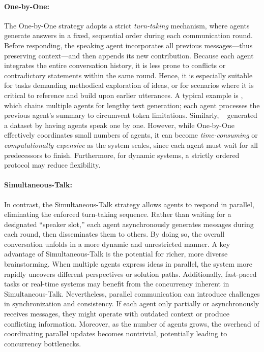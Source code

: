 \paragraph{One-by-One:}The One-by-One strategy adopts a strict \emph{turn-taking} mechanism, where agents generate answers in a fixed, sequential order during each communication round. Before responding, the speaking agent incorporates all previous messages—thus preserving context—and then appends its new contribution. Because each agent integrates the entire conversation history, it is less prone to conflicts or contradictory statements within the same round. Hence, it is especially suitable for tasks demanding methodical exploration of ideas, or for scenarios where it is critical to reference and build upon earlier utterances. A typical example is \cite{chain_of_agents}, which chains multiple agents for lengthy text generation; each agent processes the previous agent’s summary to circumvent token limitations. Similarly, ~\cite{dataset_generation} generated a dataset by having agents speak one by one. However, while One-by-One effectively coordinates small numbers of agents, it can become \emph{time-consuming} or \emph{computationally expensive} as the system scales, since each agent must wait for all predecessors to finish. Furthermore, for dynamic systems, a strictly ordered protocol may reduce flexibility.


\paragraph{Simultaneous-Talk:}In contrast, the Simultaneous-Talk strategy allows agents to respond in parallel, eliminating the enforced turn-taking sequence. Rather than waiting for a designated “speaker slot,” each agent asynchronously generates messages during each round, then disseminates them to others. By doing so, the overall conversation unfolds in a more dynamic and unrestricted manner. A key advantage of Simultaneous-Talk is the potential for richer, more diverse brainstorming. When multiple agents express ideas in parallel, the system more rapidly uncovers different perspectives or solution paths. Additionally, fast-paced tasks or real-time systems may benefit from the concurrency inherent in Simultaneous-Talk. Nevertheless, parallel communication can introduce challenges in synchronization and consistency. If each agent only partially or asynchronously receives messages, they might operate with outdated context or produce conflicting information. Moreover, as the number of agents grows, the overhead of coordinating parallel updates becomes nontrivial, potentially leading to concurrency bottlenecks.

